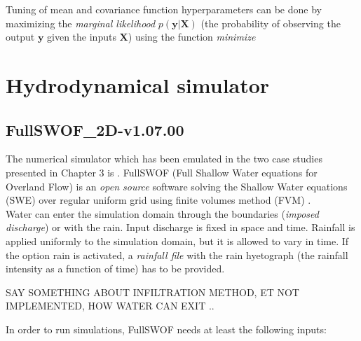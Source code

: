 Tuning of mean and covariance function hyperparameters can be done by maximizing the \emph{marginal likelihood} $p(\bm{y}\vert \bm{X})$ (the probability of observing the output $\bm{y}$ given the inputs $\bm{X}$) using the function \emph{minimize}  
 
\section{Hydrodynamical simulator}

\subsection{FullSWOF\_2D-v1.07.00}

The numerical simulator which has been emulated in the two case studies presented in Chapter 3 is . FullSWOF (Full Shallow Water equations for Overland Flow) is an \emph{open source} software solving the Shallow Water equations (SWE) over regular uniform grid using finite volumes method (FVM) %
\autocite{the_fullswof_team_fullswof_2018}. \\
 
Water can enter the simulation domain through the boundaries (\emph{imposed discharge}) or with the rain.
Input discharge is fixed in space and time. Rainfall is applied uniformly to the simulation domain, but it is allowed to vary in time. If the option rain is activated, a \emph{rainfall file} with the rain hyetograph (the rainfall intensity as a function of time) has to be provided.   

SAY SOMETHING ABOUT INFILTRATION METHOD, ET NOT IMPLEMENTED, HOW WATER CAN EXIT .. 

In order to run simulations, FullSWOF needs at least the following inputs:
